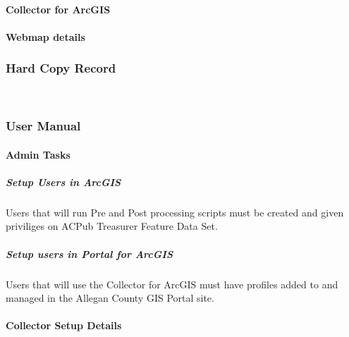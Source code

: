 \documentclass[class=article , crop=false, titlepage, twoside, multi={itemize, figure, verbatim}, float=false]{standalone}
\begin{document}
\paragraph{Collector for ArcGIS}


\paragraph{Webmap details}

\clearpage


\subsubsection{Hard Copy Record}
\clearpage
\


\subsubsection{User Manual}

\paragraph{Admin Tasks}

\subparagraph{Setup Users in ArcGIS}Users that will run Pre and Post processing scripts must be created and given priviliges on ACPub Treasurer Feature Data Set.

\subparagraph{Setup users in Portal for ArcGIS}Users that will use the Collector for ArcGIS must have profiles added to and managed in the Allegan County GIS Portal site.


\paragraph{Collector Setup Details}
\end{document}
